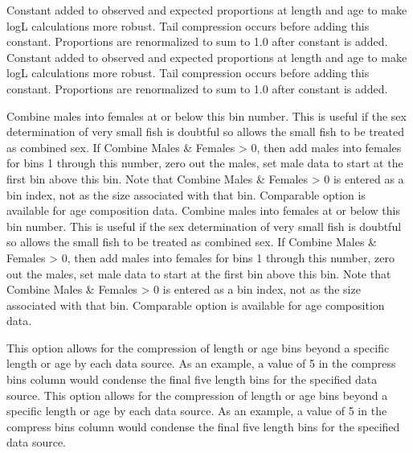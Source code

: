 Constant added to observed and expected proportions at length and age to make logL calculations more robust. Tail compression occurs before adding this constant. Proportions are renormalized to sum to 1.0 after constant is added.
Constant added to observed and expected proportions at length and age to make logL calculations more robust. Tail compression occurs before adding this constant. Proportions are renormalized to sum to 1.0 after constant is added.

Combine males into females at or below this bin number. This is useful if the sex determination of very small fish is doubtful so allows the small fish to be treated as combined sex. If Combine Males \& Females > 0, then add males into females for bins 1 through this number, zero out the males, set male data to start at the first bin above this bin. Note that Combine Males \& Females > 0 is entered as a bin index, not as the size associated with that bin. Comparable option is available for age composition data.
Combine males into females at or below this bin number. This is useful if the sex determination of very small fish is doubtful so allows the small fish to be treated as combined sex. If Combine Males \& Females > 0, then add males into females for bins 1 through this number, zero out the males, set male data to start at the first bin above this bin. Note that Combine Males \& Females > 0 is entered as a bin index, not as the size associated with that bin. Comparable option is available for age composition data.

This option allows for the compression of length or age bins beyond a specific length or age by each data source. As an example, a value of 5 in the compress bins column would condense the final five length bins for the specified data source.
This option allows for the compression of length or age bins beyond a specific length or age by each data source. As an example, a value of 5 in the compress bins column would condense the final five length bins for the specified data source.

